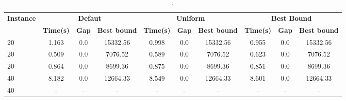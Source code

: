 \begin{table}[!h]
    \centering
    \hspace*{-1cm}\begin{tabular}{lccccccccc}
    \toprule
    \textbf{Instance}  & \multicolumn{3}{c}{\textbf{Defaut}} & \multicolumn{3}{c}{\textbf{Uniform}}  & \multicolumn{3}{c}{\textbf{Best Bound}}
    \\
    \cmidrule(r){2-4} \cmidrule(r){5-7} \cmidrule(r){8-10}
     & \textbf{Time(s)} & \textbf{Gap} & \textbf{Best bound} & \textbf{Time(s)} & \textbf{Gap} & \textbf{Best bound} & \textbf{Time(s)} & \textbf{Gap} & \textbf{Best bound}  \\
    \midrule

20 & 1.163 & 0.0 & 15332.56 & 0.998 & 0.0 & 15332.56 & 0.955 & 0.0 & 15332.56 \\
20 & 0.509 & 0.0 & 7076.52 & 0.589 & 0.0 & 7076.52 & 0.623 & 0.0 & 7076.52 \\
20 & 0.864 & 0.0 & 8699.36 & 0.875 & 0.0 & 8699.36 & 0.851 & 0.0 & 8699.36 \\
40 & 8.182 & 0.0 & 12664.33 & 8.549 & 0.0 & 12664.33 & 8.601 & 0.0 & 12664.33 \\
40 & - & - & - & - & - & - & - & - & - \\
\bottomrule
\end{tabular}
\caption{.}
\label{tab:init_senarios}
\end{table}
